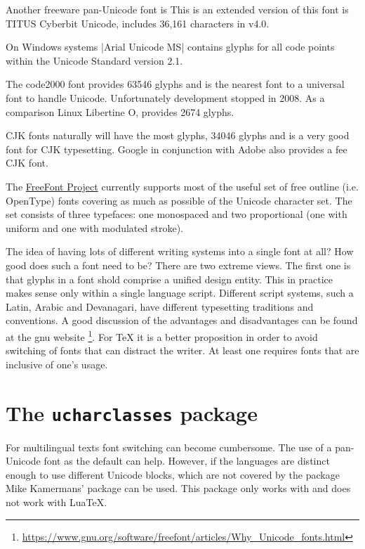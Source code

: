 Another freeware pan-Unicode font is 
This is an extended version of this font is TITUS Cyberbit Unicode, includes 36,161 characters in v4.0.

On Windows systems |Arial Unicode MS| contains glyphs for all code points within the Unicode Standard version 2.1.  

The code2000 font provides 63546 glyphs and is the nearest font to a universal font to handle Unicode. Unfortunately development stopped in 2008. As a comparison Linux Libertine O, provides 2674 glyphs. \label{code2000}

CJK fonts naturally will have the most glyphs,  34046 glyphs and is a very good font for CJK typesetting. Google in conjunction with Adobe also provides a fee CJK font.

The \href{http://ftp.gnu.org/gnu/freefont/}{FreeFont Project} currently supports most of the useful set of free outline (i.e. OpenType) fonts covering as much as possible of the Unicode character set. The set consists of three typefaces: one monospaced and two proportional (one with uniform and one with modulated stroke). 

The idea of having lots of different writing systems into a single font at all? How good does such a font need to be?
There are two extreme views.  The first one is that glyphs in a font shold comprise a unified design entity. This in practice makes sense only within a single language script. Different script systems, such a Latin, Arabic and Devanagari, have different typesetting traditions and conventions.  A good discussion of the advantages and disadvantages can be found at the gnu website \footnote{\protect\url{https://www.gnu.org/software/freefont/articles/Why_Unicode_fonts.html}}. For TeX it is a better proposition in order to avoid switching of fonts that can distract the writer. At least one requires fonts that are inclusive of one's usage. 

\section{The \texttt{ucharclasses} package}

For multilingual texts font switching can become cumbersome. The use of a pan-Unicode font as the default can help. However, if the languages are distinct enough to use different Unicode blocks, which are not covered by the  package Mike Kamermans' package  can be used. This package only works with \xelatex and does not work with LuaTeX. 

